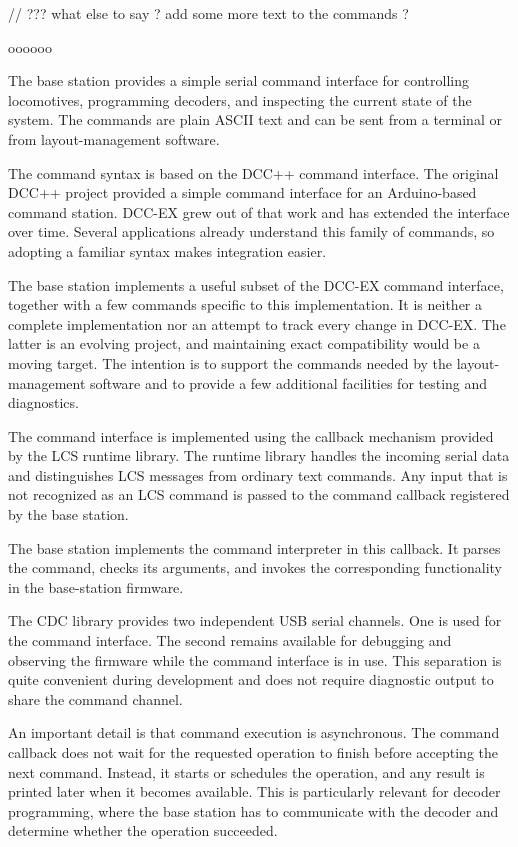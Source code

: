 // ??? what else to say ? add some more text to the commands ?


oooooo




The base station provides a simple serial command interface for controlling
locomotives, programming decoders, and inspecting the current state of the
system. The commands are plain ASCII text and can be sent from a terminal
or from layout-management software.

The command syntax is based on the DCC++ command interface. The original
DCC++ project provided a simple command interface for an Arduino-based
command station. DCC-EX grew out of that work and has extended the interface
over time. Several applications already understand this family of commands,
so adopting a familiar syntax makes integration easier.

The base station implements a useful subset of the DCC-EX command interface,
together with a few commands specific to this implementation. It is neither
a complete implementation nor an attempt to track every change in DCC-EX.
The latter is an evolving project, and maintaining exact compatibility would
be a moving target. The intention is to support the commands needed by the
layout-management software and to provide a few additional facilities for
testing and diagnostics.


The command interface is implemented using the callback mechanism provided
by the LCS runtime library. The runtime library handles the incoming serial
data and distinguishes LCS messages from ordinary text commands. Any input
that is not recognized as an LCS command is passed to the command callback
registered by the base station.

The base station implements the command interpreter in this callback. It
parses the command, checks its arguments, and invokes the corresponding
functionality in the base-station firmware.

The CDC library provides two independent USB serial channels. One is used
for the command interface. The second remains available for debugging and
observing the firmware while the command interface is in use. This separation
is quite convenient during development and does not require diagnostic output
to share the command channel.

An important detail is that command execution is asynchronous. The command
callback does not wait for the requested operation to finish before accepting
the next command. Instead, it starts or schedules the operation, and any
result is printed later when it becomes available. This is particularly
relevant for decoder programming, where the base station has to communicate
with the decoder and determine whether the operation succeeded.

